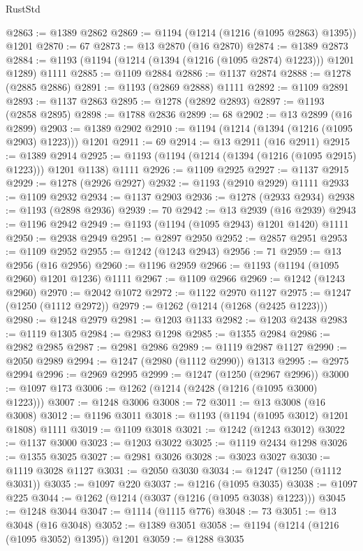 \begin{lexlean}{RustStd}
\begin{coremodule}
{\begin{coremodule}
{{{{{{{{{{{{{{{{{{{{{{{{{{{{{{{@2863 := @1389 @2862
@2869 := @1194 (@1214 (@1216 (@1095 @2863) @1395)) @1201
@2870 := 67
@2873 := @13 @2870 (@16 @2870)
@2874 := @1389 @2873
@2884 := @1193 (@1194 (@1214 (@1394 (@1216 (@1095 @2874) @1223))) @1201 @1289) @1111
@2885 := @1109 @2884
@2886 := @1137 @2874
@2888 := @1278 (@2885 @2886)
@2891 := @1193 (@2869 @2888) @1111
@2892 := @1109 @2891
@2893 := @1137 @2863
@2895 := @1278 (@2892 @2893)
@2897 := @1193 (@2858 @2895)
@2898 := @1788 @2836
@2899 := 68
@2902 := @13 @2899 (@16 @2899)
@2903 := @1389 @2902
@2910 := @1194 (@1214 (@1394 (@1216 (@1095 @2903) @1223))) @1201
@2911 := 69
@2914 := @13 @2911 (@16 @2911)
@2915 := @1389 @2914
@2925 := @1193 (@1194 (@1214 (@1394 (@1216 (@1095 @2915) @1223))) @1201 @1138) @1111
@2926 := @1109 @2925
@2927 := @1137 @2915
@2929 := @1278 (@2926 @2927)
@2932 := @1193 (@2910 @2929) @1111
@2933 := @1109 @2932
@2934 := @1137 @2903
@2936 := @1278 (@2933 @2934)
@2938 := @1193 (@2898 @2936)
@2939 := 70
@2942 := @13 @2939 (@16 @2939)
@2943 := @1196 @2942
@2949 := @1193 (@1194 (@1095 @2943) @1201 @1420) @1111
@2950 := @2938 @2949
@2951 := @2897 @2950
@2952 := @2857 @2951
@2953 := @1109 @2952
@2955 := @1242 (@1243 @2943)
@2956 := 71
@2959 := @13 @2956 (@16 @2956)
@2960 := @1196 @2959
@2966 := @1193 (@1194 (@1095 @2960) @1201 @1236) @1111
@2967 := @1109 @2966
@2969 := @1242 (@1243 @2960)
@2970 := @2042 @1072
@2972 := @1122 @2970 @1127
@2975 := @1247 (@1250 (@1112 @2972))
@2979 := @1262 (@1214 (@1268 (@2425 @1223)))
@2980 := @1248 @2979
@2981 := @1203 @1133
@2982 := @1203 @2438
@2983 := @1119 @1305
@2984 := @2983 @1298
@2985 := @1355 @2984
@2986 := @2982 @2985
@2987 := @2981 @2986
@2989 := @1119 @2987 @1127
@2990 := @2050 @2989
@2994 := @1247 (@2980 (@1112 @2990)) @1313
@2995 := @2975 @2994
@2996 := @2969 @2995
@2999 := @1247 (@1250 (@2967 @2996))
@3000 := @1097 @173
@3006 := @1262 (@1214 (@2428 (@1216 (@1095 @3000) @1223)))
@3007 := @1248 @3006
@3008 := 72
@3011 := @13 @3008 (@16 @3008)
@3012 := @1196 @3011
@3018 := @1193 (@1194 (@1095 @3012) @1201 @1808) @1111
@3019 := @1109 @3018
@3021 := @1242 (@1243 @3012)
@3022 := @1137 @3000
@3023 := @1203 @3022
@3025 := @1119 @2434 @1298
@3026 := @1355 @3025
@3027 := @2981 @3026
@3028 := @3023 @3027
@3030 := @1119 @3028 @1127
@3031 := @2050 @3030
@3034 := @1247 (@1250 (@1112 @3031))
@3035 := @1097 @220
@3037 := @1216 (@1095 @3035)
@3038 := @1097 @225
@3044 := @1262 (@1214 (@3037 (@1216 (@1095 @3038) @1223)))
@3045 := @1248 @3044
@3047 := @1114 (@1115 @776)
@3048 := 73
@3051 := @13 @3048 (@16 @3048)
@3052 := @1389 @3051
@3058 := @1194 (@1214 (@1216 (@1095 @3052) @1395)) @1201
@3059 := @1288 @3035
}}}}}}}}}}}}}}}}}}}}}}}}}}}}}}}
\end{coremodule}}
\end{coremodule}
\end{lexlean}
